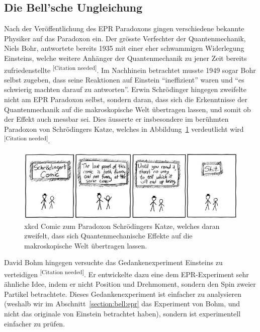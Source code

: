 \begin{refsection}
\section{Die Bell'sche Ungleichung\label{section:bell:bell}}
Nach der Ver\"offentlichung des EPR Paradoxons gingen verschiedene bekannte
Physiker auf das Paradoxon ein.
Der gr\"osste Verfechter der Quantenmechanik, Niels Bohr, antwortete bereits
1935 mit einer eher schwammigen Widerlegung Einsteins, welche weitere 
Anh\"anger der Quantenmechanik zu jener Zeit bereits zufriedenstellte
\textsuperscript{[Citation needed]}.
Im Nachhinein betrachtet musste 1949 sogar Bohr selbst zugeben, dass seine
Reaktionen auf Einstein \enquote{ineffizient} waren und 
\enquote{es schwierig machten darauf zu antworten}. 
Erwin Schr\"odinger hingegen zweifelte nicht am EPR Paradoxon selbst, sondern
daran, dass sich die Erkenntnisse der Quantenmechanik auf die makroskopische
Welt \"ubertragen lassen, und somit ob der Effekt auch messbar sei.
Dies \"ausserte er insbesondere im ber\"uhmten Paradoxon von 
Schr\"odingers Katze, welches in Abbildung~\ref{fig:bell:xkcd_schroedinger}
verdeutlicht wird \textsuperscript{[Citation needed]}.

\begin{figure}
    \centering
    \includegraphics[width=0.8\linewidth]{bell/images/xkcd_schroedinger.jpg}
    \caption{xkcd Comic zum Paradoxon Schr\"odingers Katze, welches daran
    zweifelt, dass sich Quantenmechanische Effekte auf die makroskopische
    Welt \"ubertragen lassen. \cite{Bell:XkcdSchroedinger}}
    \label{fig:bell:xkcd_schroedinger}
\end{figure}

David Bohm hingegen versuchte das Gedankenexperiment Einsteins zu verteidigen
\textsuperscript{[Citation needed]}.
Er entwickelte dazu eine dem EPR-Experiment sehr \"ahnliche Idee, indem er
nicht Position und Drehmoment, sondern den Spin zweier Partikel betrachtete.
Dieses Gedankenexperiment ist einfacher zu analysieren (weshalb wir im
Abschnitt~\ref{section:bell:epr} das Experiment von Bohm, und nicht das
originale von Einstein betrachtet haben), sondern ist experimentell einfacher
zu pr\"ufen.



\end{refsection}

